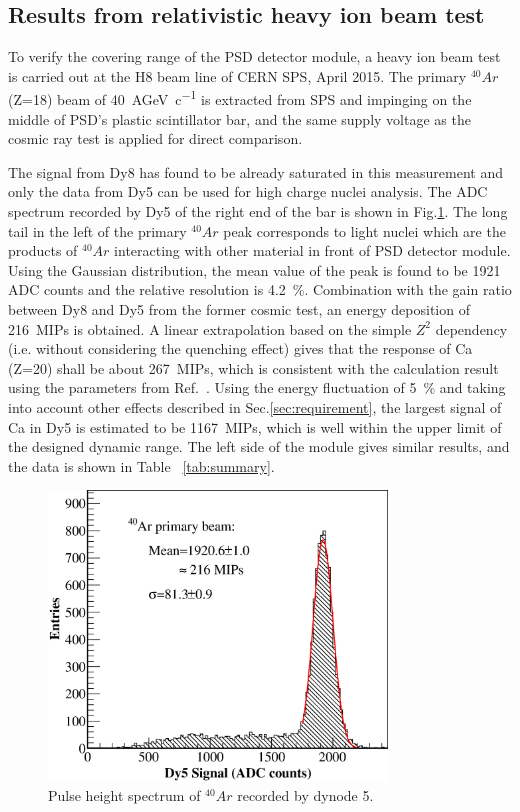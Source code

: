 \documentclass[preprint, times]{elsarticle}
\begin{document}
\subsection{Results from relativistic heavy ion beam test}
\label{sec:beam}
To verify the covering range of the PSD detector module, a heavy ion beam test is carried out at the H8 beam line of CERN SPS, April 2015.
The primary $^{40}{Ar}$ (Z=18) beam of \SI{40}{AGeV\per c} is extracted from SPS and impinging on the middle of PSD's plastic scintillator bar, and the same supply voltage as the cosmic ray test is applied for direct comparison.

The signal from Dy8 has found to be already saturated in this measurement and only the data from Dy5 can be used for high charge nuclei analysis.
The ADC spectrum recorded by Dy5 of the right end of the bar is shown in Fig.\ref{fig:Ar}.
The long tail in the left of the primary $^{40}Ar$ peak corresponds to light nuclei which are the products of $^{40}Ar$ interacting with other material in front of PSD detector module.
Using the Gaussian distribution, the mean value of the peak is found to be 1921 ADC counts and the relative resolution is \SI{4.2}{\percent}.
 Combination with the gain ratio between  Dy8 and Dy5 from the former cosmic test, an energy deposition of \SI{216}{MIPs} is obtained. A linear extrapolation based on the simple $Z^2$ dependency (i.e. without considering the quenching effect) gives that the response of Ca (Z=20) shall be about \SI{267}{MIPs}, which is consistent with the calculation result using the parameters from Ref.~\cite{bindi2005performance}. Using the energy fluctuation of \SI{5}{\percent} and taking into account other effects described in Sec.\ref{sec:requirement}, the largest signal of Ca in Dy5 is estimated to be \SI{1167}{MIPs}, which is well within the upper limit of the designed dynamic range. The left side of the module gives similar results, and the data is shown in Table ~\ref{tab:summary}.

\begin{figure}
 \centering
 \includegraphics[width=90mm]{Ar}
\caption{Pulse height spectrum of $^{40}Ar$ recorded by dynode 5.}
\label{fig:Ar}
\end{figure}
\end{document}
